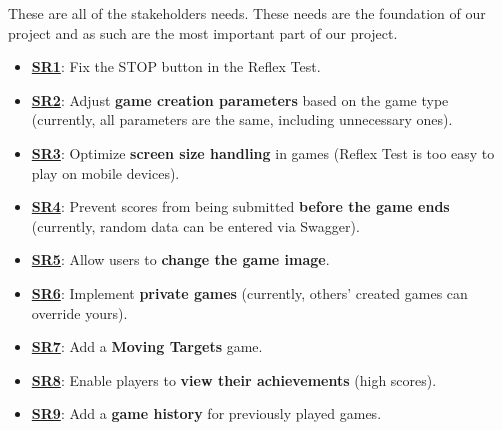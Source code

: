\documentclass[]{VUMIFTemplateClass}
\begin{document}

\label{sec:stakeholders_needs}
These are all of the stakeholders needs. These needs are the foundation of our project and as such are the most important part of our project.


\begin{itemize}
    \item 
    \hypertarget{SR1}{}\hyperlink{SR1}{\textbf{SR1}}: Fix the STOP button in the Reflex Test.
    
    \item 
    \hypertarget{SR2}{}\hyperlink{SR2}{\textbf{SR2}}: Adjust \textbf{game creation parameters} based on the game type (currently, all parameters are the same, including unnecessary ones).
    
    \item 
    \hypertarget{SR3}{}\hyperlink{SR3}{\textbf{SR3}}: Optimize \textbf{screen size handling} in games (Reflex Test is too easy to play on mobile devices).
    
    \item 
    \hypertarget{SR4}{}\hyperlink{SR4}{\textbf{SR4}}: Prevent scores from being submitted \textbf{before the game ends} (currently, random data can be entered via Swagger).
    
    \item 
    \hypertarget{SR5}{}\hyperlink{SR5}{\textbf{SR5}}: Allow users to \textbf{change the game image}.
    
    \item 
    \hypertarget{SR6}{}\hyperlink{SR6}{\textbf{SR6}}: Implement \textbf{private games} (currently, others' created games can override yours).
    
    \item 
    \hypertarget{SR7}{}\hyperlink{SR7}{\textbf{SR7}}: Add a \textbf{Moving Targets} game.
    
    \item 
    \hypertarget{SR8}{}\hyperlink{SR8}{\textbf{SR8}}: Enable players to \textbf{view their achievements} (high scores).
    
    \item 
    \hypertarget{SR9}{}\hyperlink{SR9}{\textbf{SR9}}: Add a \textbf{game history} for previously played games.
    

\end{itemize}
\end{document}
